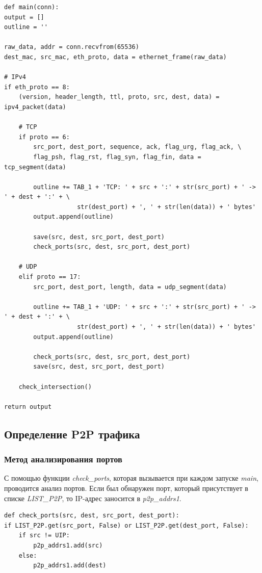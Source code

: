 \documentclass[bachelor, och, coursework]{SCWorks}
\begin{document}
\begin{verbatim}
def main(conn):
output = []
outline = ''

raw_data, addr = conn.recvfrom(65536)
dest_mac, src_mac, eth_proto, data = ethernet_frame(raw_data)

# IPv4
if eth_proto == 8:
    (version, header_length, ttl, proto, src, dest, data) = ipv4_packet(data)

    # TCP
    if proto == 6:
        src_port, dest_port, sequence, ack, flag_urg, flag_ack, \
        flag_psh, flag_rst, flag_syn, flag_fin, data = tcp_segment(data)

        outline += TAB_1 + 'TCP: ' + src + ':' + str(src_port) + ' -> ' + dest + ':' + \
                    str(dest_port) + ', ' + str(len(data)) + ' bytes'
        output.append(outline)

        save(src, dest, src_port, dest_port)
        check_ports(src, dest, src_port, dest_port)

    # UDP
    elif proto == 17:
        src_port, dest_port, length, data = udp_segment(data)

        outline += TAB_1 + 'UDP: ' + src + ':' + str(src_port) + ' -> ' + dest + ':' + \
                    str(dest_port) + ', ' + str(len(data)) + ' bytes'
        output.append(outline)

        check_ports(src, dest, src_port, dest_port)
        save(src, dest, src_port, dest_port)

    check_intersection()

return output    
\end{verbatim}

\subsection{Определение P2P трафика}
\subsubsection{Метод анализирования портов}
С помощью функции \textit{check_ports}, которая вызывается при каждом запуске \textit{main}, проводится анализ портов. 
Если был обнаружен порт, который присутствует в списке \textit{LIST_P2P}, то IP-адрес заносится в \textit{p2p_addrs1}.

\begin{verbatim}
def check_ports(src, dest, src_port, dest_port):
if LIST_P2P.get(src_port, False) or LIST_P2P.get(dest_port, False):
    if src != UIP:
        p2p_addrs1.add(src)
    else:
        p2p_addrs1.add(dest)
\end{verbatim}
\end{document}
